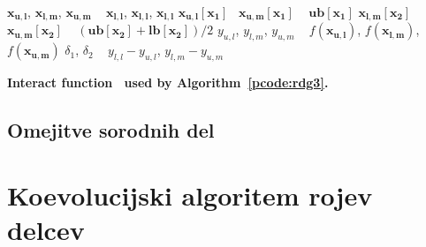 \begin{algorithm}

	$\mathbf{x_{u,l}}$, $\mathbf{x_{l,m}}$, $\mathbf{x_{u,m}}$  \gets~ $\mathbf{x_{l,l}}$, $\mathbf{x_{l,l}}$, $\mathbf{x_{l,l}}$\;
	$\mathbf{x_{u,l}}[\mathbf{x_1}]$ \gets~$\mathbf{x_{u,m}}[\mathbf{x_1}]$ \gets~ $\mathbf{ub}[\mathbf{x_1}]$\;
	$\mathbf{x_{l,m}}[\mathbf{x_2}]$ \gets~ $\mathbf{x_{u,m}}[\mathbf{x_2}]$ \gets~ $(\mathbf{ub}[\mathbf{x_2}] + \mathbf{lb}[\mathbf{x_2}]) / 2$\;
	$y_{u,l}$, $y_{l,m}$, $y_{u,m}$ \gets~ $f(\mathbf{x_{u,l}})$, $f(\mathbf{x_{l,m}})$, $f(\mathbf{x_{u,m}})$\;
	$\delta_1$, $\delta_2$ \gets~ $y_{l,l} - y_{u,l}$, $y_{l,m} - y_{u,m}$\;
	\;

	\caption{\textbf{Interact function~\cite{alg:rdg3} used by Algorithm~\ref{pcode:rdg3}.}}
	\label{pcode:interact}
\end{algorithm}

\section{Omejitve sorodnih del}


\chapter{Koevolucijski algoritem rojev delcev}\label{chap:algo}


